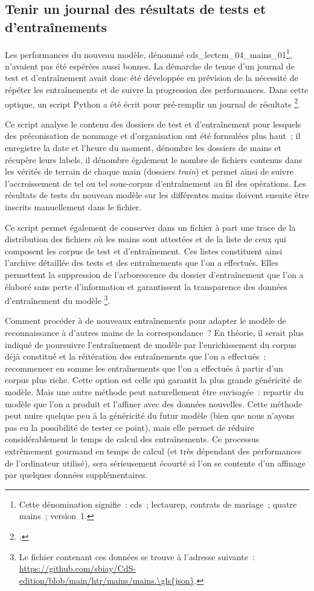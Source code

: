 \documentclass[a4paper,12pt,twoside]{book}
\begin{document}
			\subsection{Tenir un journal des résultats de tests et d'entraînements}
				\label{journal-test}
				Les performances du nouveau modèle, dénommé \textsf{cds\_lectcm\_04\_mains\_01}\footnote{Cette dénomination signifie~: \gls{cds}~; \gls{lectaurep}, contrats de mariage~; quatre mains~; version~1.}, n'avaient pas été espérées aussi bonnes. La démarche de tenue d'un journal de test et d'entraînement avait donc été développée en prévision de la nécessité de répéter les entraînements et de suivre la progression des performances. Dans cette optique, un script Python a été écrit pour pré-remplir un journal de résultats
				\footcite{biayJournalReconnPy2022}. 
				
				Ce script analyse le contenu des dossiers de test et d'entraînement pour lesquels des préconisation de nommage et d'organisation ont été formulées plus haut~; il enregistre la date et l'heure du moment, dénombre les dossiers de mains et récupère leurs labels, il dénombre également le nombre de fichiers contenus dans les vérités de terrain de chaque main (dossiers \textit{train}) et permet ainsi de suivre l'accroissement de tel ou tel sous-corpus d'entraînement au fil des opérations. Les résultats de tests du nouveau modèle sur les différentes mains doivent ensuite être inscrits manuellement dans le fichier.
				
				Ce script permet également de conserver dans un fichier à part une trace de la distribution des fichiers où les mains sont attestées et de la liste de ceux qui composent les corpus de test et d'entraînement. Ces listes constituent ainsi l'archive détaillée des tests et des entraînements que l'on a effectués. Elles permettent la suppression de l'arborescence du dossier d'entraînement que l'on a élaboré sans perte d'information et garantissent la transparence des données d'entraînement du modèle%
				\footnote{Le fichier contenant ces données se trouve à l'adresse suivante~: \url{https://github.com/sbiay/CdS-edition/blob/main/htr/mains/mains.\gls{json}}.}.
				
				Comment procéder à de nouveaux entraînements pour adapter le modèle de reconnaissance à d'autres mains de la correspondance~? En théorie, il serait plus indiqué de poursuivre l'entraînement de modèle par l'enrichissement du corpus déjà constitué et la réitération des entraînements que l'on a effectués~: recommencer en somme les entraînements que l'on a effectués à partir d'un corpus plus riche. Cette option est celle qui garantit la plus grande généricité de modèle. Mais une autre méthode peut naturellement être envisagée~: repartir du modèle que l'on a produit et l'affiner avec des données nouvelles. Cette méthode peut nuire quelque peu à la généricité du futur modèle (bien que nous n'ayons pas eu la possibilité de tester ce point), mais elle permet de réduire considérablement le temps de calcul des entraînements. Ce processus extrêmement gourmand en temps de calcul (et très dépendant des performances de l'ordinateur utilisé), sera sérieusement écourté si l'on se contente d'un affinage par quelques données supplémentaires.
							
\end{document}
